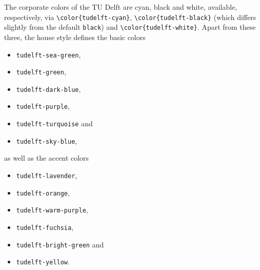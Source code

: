 The corporate colors of the TU Delft are cyan, black and white, available, respectively, via \texttt{\textbackslash color\{{\color{tudelft-cyan}tudelft-cyan}\}}, \texttt{\textbackslash color\{{\color{tudelft-black}tudelft-black}\}} (which differs slightly from the default \texttt{black}) and \texttt{\textbackslash color\{tudelft-white\}}. Apart from these three, the house style defines the basic colors
\begin{itemize}
\itemsep 0pt
\parskip 0pt
\item\texttt{\color{tudelft-sea-green}tudelft-sea-green},
\item\texttt{\color{tudelft-green}tudelft-green},
\item\texttt{\color{tudelft-dark-blue}tudelft-dark-blue},
\item\texttt{\color{tudelft-purple}tudelft-purple},
\item\texttt{\color{tudelft-turquoise}tudelft-turquoise} and
\item\texttt{\color{tudelft-sky-blue}tudelft-sky-blue},
\end{itemize}
as well as the accent colors
\begin{itemize}
\itemsep 0pt
\parskip 0pt
\item\texttt{\color{tudelft-lavender}tudelft-lavender},
\item\texttt{\color{tudelft-orange}tudelft-orange},
\item\texttt{\color{tudelft-warm-purple}tudelft-warm-purple},
\item\texttt{\color{tudelft-fuchsia}tudelft-fuchsia},
\item\texttt{\color{tudelft-bright-green}tudelft-bright-green} and
\item\texttt{\color{tudelft-yellow}tudelft-yellow}.
\end{itemize}

